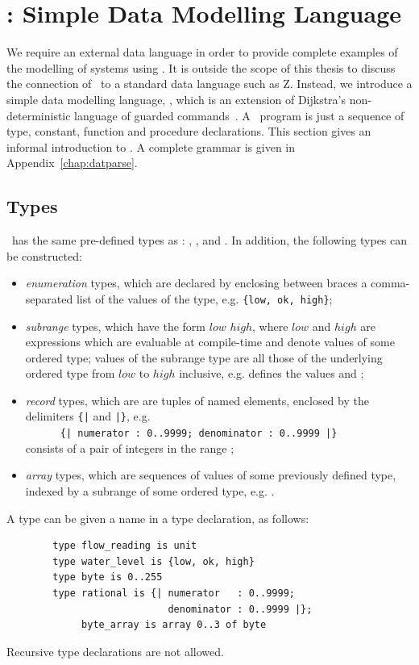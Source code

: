 \section{\sdml: Simple Data Modelling Language\label{sec:prsdml}}
We require an external data language in order to provide complete examples of
the modelling of systems using \candle. It is outside the scope of this thesis
to discuss the connection of \candle\ to a standard data language such
as Z. Instead, we introduce a simple data modelling language, \sdml,
which is an extension of Dijkstra's non-deterministic language of 
guarded commands~\cite{dij:76}. A \sdml\ program is just a sequence of type, 
constant, function and procedure declarations.  
This section gives an informal introduction to \sdml. A complete grammar is 
given in Appendix~\ref{chap:datparse}.  
\subsection{Types}
\sdml\ has the same pre-defined types as \candle: ,
,  and . In addition, the 
following types can be constructed:
\begin{itemize}
\item \emph{enumeration} types, which are declared by enclosing
  between braces a comma-separated list of the values of the type,
  e.g. \verb'{low, ok, high}';
\item \emph{subrange} types, which have the form $low$  $high$, where 
  $low$ and $high$ are expressions which are evaluable at 
  compile-time and denote values of some ordered type; values of 
  the subrange type are all those of the underlying ordered type from $low$ 
  to $high$ inclusive, e.g.  defines the values 
   and ;
\item \emph{record} types, which are are tuples of named elements, enclosed 
  by the delimiters \verb'{|' and \verb'|}', e.g. \\
  \verb'      {| numerator : 0..9999; denominator : 0..9999 |}' \\
  consists of a pair of integers in the range ;
\item \emph{array} types, which are sequences of values of
  some previously defined type, indexed by a subrange of some ordered
  type, e.g. .  
\end{itemize}
A type can be given a name in a type declaration, as follows:
\begin{verbatim}
        type flow_reading is unit 
        type water_level is {low, ok, high}
        type byte is 0..255
        type rational is {| numerator   : 0..9999; 
                            denominator : 0..9999 |};
             byte_array is array 0..3 of byte
\end{verbatim}
Recursive type declarations are not allowed.

